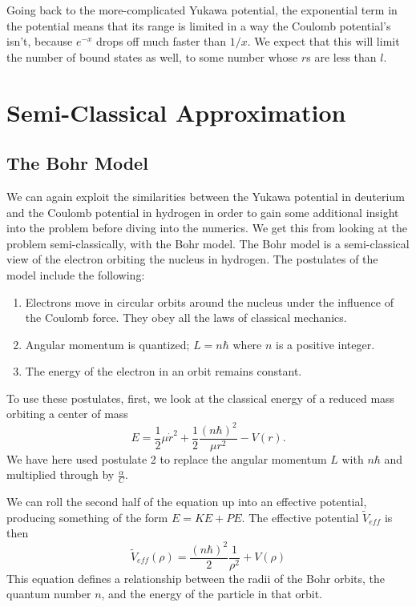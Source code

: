 \documentclass[12pt,twoside]{reedthesis}
\newcommand{\eqn}[1]{\begin{equation}#1\end{equation}}
\begin{document}
Going back to the more-complicated Yukawa potential, the exponential term in the potential means that its range is limited in a way the Coulomb potential's isn't, because $e^{-x}$ drops off much faster than $1/x$. We expect that this will limit the number of bound states as well, to some number whose $r$s are less than $l$.

\clearpage %

\chapter{Semi-Classical Approximation}
\section{The Bohr Model}
We can again exploit the similarities between the Yukawa potential in deuterium and the Coulomb potential in hydrogen in order to gain some additional insight into the problem before diving into the numerics. We get this from looking at the problem semi-classically, with the Bohr model. The Bohr model is a semi-classical view of the electron orbiting the nucleus in hydrogen. The postulates of the model include the following:
\begin{enumerate}
\item Electrons move in circular orbits around the nucleus under the influence of the Coulomb force. They obey all the laws of classical mechanics.
\item Angular momentum is quantized; $L = n\hbar$ where $n$ is a positive integer.
\item The energy of the electron in an orbit remains constant.
\end{enumerate}

To use these postulates, first, we look at the classical energy of a reduced mass orbiting a center of mass
\eqn{
E = \frac{1}{2}\mu \dot{r}^2+\frac{1}{2}\frac{(n \hbar)^2}{\mu r^2}-V(r)\mbox{.}
\label{eq:classical-energy}
}
We have here used postulate 2 to replace the angular momentum $L$ with $n \hbar$ and multiplied through by $\frac{\alpha}{C}$. 

We can roll the second half of the equation up into an effective potential, producing something of the form $E = KE + PE$. The effective potential $\tilde{V}_{eff}$ is then
\eqn{
\tilde{V}_{eff}(\rho)=\frac{(n \hbar)^2}{2}\frac{1}{\rho^2}+V(\rho)
\label{eq:veff}
}
This equation defines a relationship between the radii of the Bohr orbits, the quantum number $n$, and the energy of the particle in that orbit. 
\end{document}
